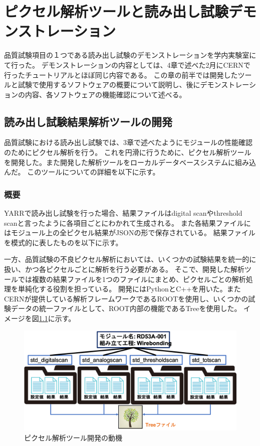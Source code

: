 \chapter{ピクセル解析ツールと読み出し試験デモンストレーション}
品質試験項目の１つである読み出し試験のデモンストレーションを学内実験室にて行った。
デモンストレーションの内容としては、4章で述べた2月にCERNで行ったチュートリアルとほぼ同じ内容である。
この章の前半では開発したツールと試験で使用するソフトウェアの概要について説明し、後にデモンストレーションの内容、各ソフトウェアの機能確認について述べる。

\section{読み出し試験結果解析ツールの開発}
品質試験における読み出し試験では、3章で述べたようにモジュールの性能確認のためにピクセル解析を行う。
これを円滑に行うために、ピクセル解析ツールを開発した。また開発した解析ツールをローカルデータベースシステムに組み込んだ。
このツールについての詳細を以下に示す。

\subsection{概要}
YARRで読み出し試験を行った場合、結果ファイルはdigital scanやthreshold scanと言ったように各項目ごとにわかれて生成される。
また各結果ファイルにはモジュール上の全ピクセル結果がJSONの形で保存されている。
結果ファイルを模式的に表したものを以下に示す。

一方、品質試験の不良ピクセル解析においては、いくつかの試験結果を統一的に扱い、かつ各ピクセルごとに解析を行う必要がある。
そこで、開発した解析ツールでは複数の結果ファイルを1つのファイルにまとめ、ピクセルごとの解析処理を単純化する役割を担っている。
開発にはPythonとC++を用いた。またCERNが提供している解析フレームワークであるROOTを使用し、いくつかの試験データの統一ファイルとして、ROOT内部の機能であるTreeを使用した。
イメージを図\ref{analysis_tool_motivation}に示す。

\begin{figure}[bpt]\centering
\includegraphics[width=12cm]{analysis_tool_motivation}
\caption[ピクセル解析ツール開発の動機]{ピクセル解析ツール開発の動機}
\label{analysis_tool_motivation}
\end{figure}

